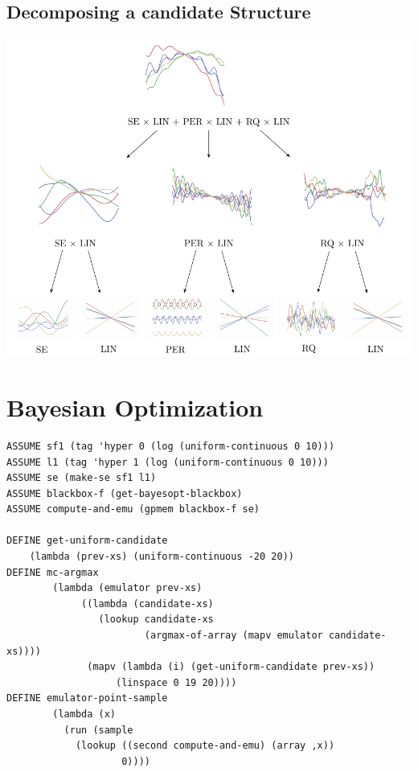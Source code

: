 \documentclass[a0,portrait]{a0poster}
\begin{document}
\begin{multicols}{3}
 \subsection*{Decomposing a candidate Structure}
\begin{center}\vspace{1cm}
\includegraphics[width=0.7\linewidth]{parseTree.pdf}
\end{center}\vspace{1cm}
 
\vfill
\columnbreak
\section*{Bayesian Optimization}

\begin{minipage}{\linewidth}
\begin{lstlisting}[frame=single,label=alg:structureVent,caption=Venture Code for Bayesian Optimization,mathescape]
ASSUME sf1 (tag 'hyper 0 (log (uniform-continuous 0 10)))
ASSUME l1 (tag 'hyper 1 (log (uniform-continuous 0 10)))
ASSUME se (make-se sf1 l1)
ASSUME blackbox-f (get-bayesopt-blackbox)
ASSUME compute-and-emu (gpmem blackbox-f se)

DEFINE get-uniform-candidate 
	(lambda (prev-xs) (uniform-continuous -20 20))
DEFINE mc-argmax
        (lambda (emulator prev-xs)
             ((lambda (candidate-xs)
                (lookup candidate-xs
                        (argmax-of-array (mapv emulator candidate-xs))))
              (mapv (lambda (i) (get-uniform-candidate prev-xs))
                   (linspace 0 19 20))))
DEFINE emulator-point-sample
        (lambda (x)
          (run (sample
            (lookup ((second compute-and-emu) (array ,x))
                    0))))


\end{lstlisting}
\end{minipage}
\end{multicols}
\end{document}
